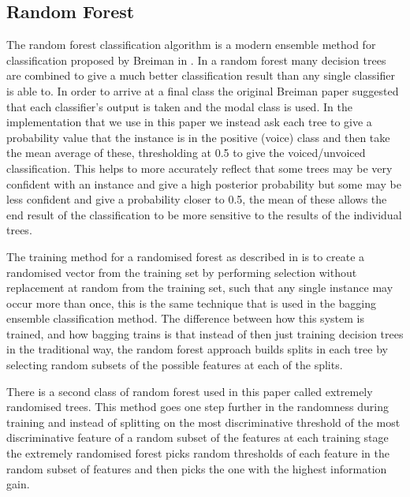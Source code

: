 \documentclass[ %
                    author={Sam Phippen},
                supervisor={Dr. Rafal Bogacz},
                     title={Real time voice activity detectors in noisy personal computing environments},
                  subtitle={},
                    degree={MEng},
                      year={2012} ]{thesis}
\begin{document}
\subsection{Random Forest}

The random forest classification algorithm is a modern ensemble method for
classification proposed by Breiman in \cite{breiman}. In a random forest many
decision trees are combined to give a much better classification result than
any single classifier is able to. In order to arrive at a final class the
original Breiman paper suggested that each classifier's output is taken and the
modal class is used. In the implementation that we use in this paper we instead
ask each tree to give a probability value that the instance is in the positive
(voice) class and then take the mean average of these, thresholding at 0.5 to
give the voiced/unvoiced classification. This helps to more accurately reflect
that some trees may be very confident with an instance and give a high
posterior probability but some may be less confident and give a probability
closer to 0.5, the mean of these allows the end result of the classification to
be more sensitive to the results of the individual trees.

The training method for a randomised forest as described in \cite{breiman} is
to create a randomised vector from the training set by performing selection
without replacement at random from the training set, such that any single
instance may occur more than once, this is the same technique that is used in
the bagging ensemble classification method. The difference between how this
system is trained, and how bagging trains is that instead of then just training
decision trees in the traditional way, the random forest approach builds splits
in each tree by selecting random subsets of the possible features at each of
the splits.

There is a second class of random forest used in this paper called extremely
randomised trees. This method goes one step further in the randomness during
training and instead of splitting on the most discriminative threshold of the
most discriminative feature of a random subset of the features at each training
stage the extremely randomised forest picks random thresholds of each feature
in the random subset of features and then picks the one with the highest information
gain.
\end{document}
